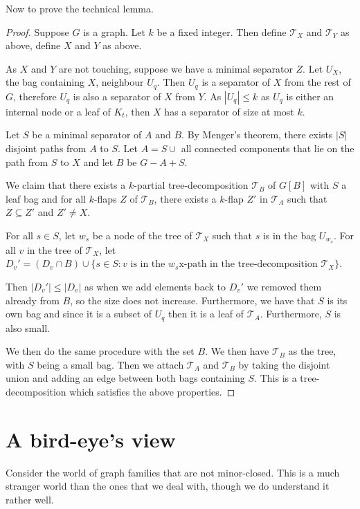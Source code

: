 \documentclass[]{article}
\newcommand{\tree}{\mathcal{T}}
\theoremstyle{definition}
\numberwithin{theorem}{section}
\numberwithin{equation}{section}
\begin{document}
Now to prove the technical lemma.

\begin{proof}
	Suppose $G$ is a graph. Let $k$ be a fixed integer. Then define $\tree_X$ and $\tree_Y$ as above, define $X$ and $Y$ as above.
	
	As $X$ and $Y$ are not touching, suppose we have a minimal separator $Z$. Let $U_X$, the bag containing $X$, neighbour $U_q$. Then $U_q$ is a separator of $X$ from the rest of $G$, therefore $U_q$ is also a separator of $X$ from $Y$. As $|U_q| \leq k$ as $U_q$ is either an internal node or a leaf of $K_t$, then $X$ has a separator of size at most $k$. 
	
	Let $S$ be a minimal separator of $A$ and $B$. By Menger's theorem, there exists $|S|$ disjoint paths from $A$ to $S$. Let $A = S \cup$ all connected components that lie on the path from $S$ to $X$ and let $B$ be $G - A + S$. 
	
	We claim that there exists a $k$-partial tree-decomposition $\tree_B$ of $G[B]$ with $S$ a leaf bag and for all $k$-flaps $Z$ of $\tree_B$, there exists a $k$-flap $Z'$ in $\tree_A$ such that $Z \subseteq Z'$ and $Z' \neq X$. 
	
	For all $s \in S$, let $w_s$ be a node of the tree of $\tree_X$ such that $s$ is in the bag $U_{w_s}$. 
	For all $v$ in the tree of $\tree_X$, let $D_v' = (D_v \cap B) \cup \lbrace s \in S : v \text{ is in the } w_s \text{x-path in the tree-decomposition } \tree_X \rbrace$. 
	
	Then $|D_v'| \leq |D_v|$ as when we add elements back to $D_v'$ we removed them already from $B$, so the size does not increase.
	Furthermore, we have that $S$ is its own bag and since it is a subset of $U_q$ then it is a leaf of $\tree_A$. Furthermore, $S$ is also small.
	
	We then do the same procedure with the set $B$. We then have $\tree_B$ as the tree, with $S$ being a small bag. Then we attach $\tree_A$ and $\tree_B$ by taking the disjoint union and adding an edge between both bags containing $S$. This is a tree-decomposition which satisfies the above properties. 
\end{proof}

\section{A bird-eye's view}
Consider the world of graph families that are not minor-closed. This is a much stranger world than the ones that we deal with, though we do understand it rather well.
\end{document}

